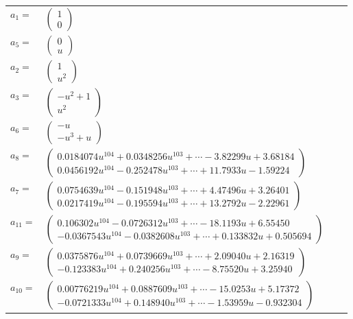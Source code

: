 \documentclass[1p]{elsarticle_modified}
\theoremstyle{definition}
\begin{document}
\begin{tabular}{m{7pt} m{180pt} m{7pt} m{180pt} }
\flushright $a_{1}=$&$\begin{pmatrix}1\\0\end{pmatrix}$ \\
\flushright $a_{5}=$&$\begin{pmatrix}0\\u\end{pmatrix}$ \\
\flushright $a_{2}=$&$\begin{pmatrix}1\\u^2\end{pmatrix}$ \\
\flushright $a_{3}=$&$\begin{pmatrix}- u^2+1\\u^2\end{pmatrix}$ \\
\flushright $a_{6}=$&$\begin{pmatrix}- u\\- u^3+u\end{pmatrix}$ \\
\flushright $a_{8}=$&$\begin{pmatrix}0.0184074 u^{104}+0.0348256 u^{103}+\cdots-3.82299 u+3.68184\\0.0456192 u^{104}-0.252478 u^{103}+\cdots+11.7933 u-1.59224\end{pmatrix}$ \\
\flushright $a_{7}=$&$\begin{pmatrix}0.0754639 u^{104}-0.151948 u^{103}+\cdots+4.47496 u+3.26401\\0.0217419 u^{104}-0.195594 u^{103}+\cdots+13.2792 u-2.22961\end{pmatrix}$ \\
\flushright $a_{11}=$&$\begin{pmatrix}0.106302 u^{104}-0.0726312 u^{103}+\cdots-18.1193 u+6.55450\\-0.0367543 u^{104}-0.0382608 u^{103}+\cdots+0.133832 u+0.505694\end{pmatrix}$ \\
\flushright $a_{9}=$&$\begin{pmatrix}0.0375876 u^{104}+0.0739669 u^{103}+\cdots+2.09040 u+2.16319\\-0.123383 u^{104}+0.240256 u^{103}+\cdots-8.75520 u+3.25940\end{pmatrix}$ \\
\flushright $a_{10}=$&$\begin{pmatrix}0.00776219 u^{104}+0.0887609 u^{103}+\cdots-15.0253 u+5.17372\\-0.0721333 u^{104}+0.148940 u^{103}+\cdots-1.53959 u-0.932304\end{pmatrix}$ \\

\end{tabular}
\end{document}
